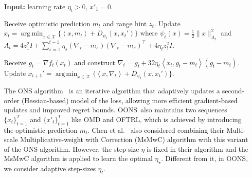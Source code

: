 \documentclass{article}
\renewcommand{\citet}{\citep}
\theoremstyle{plain}
\theoremstyle{definition}
\theoremstyle{remark}
\DeclareMathOperator*{\argmin}{arg\,min}
\newcommand{\cX}{\mathcal{X}}
\newcommand{\oons}{{\sc OONS}}
\newcommand{\inner}[2]{\left\langle #1, #2 \right\rangle}
\begin{document}
\begin{algorithm}[t]
\caption{Optimistic Online Newton Step (OONS)}
\label{alg:ONS}

    \textbf{Input:} learning rate $\eta_t>0$, $x'_1=0$.
    
    \begin{algorithmic}[1]
        \STATE Receive optimistic prediction $m_t$ and range hint $z_t$.
        \STATE Update $x_t = \argmin_{x\in\cX}\{\inner{x}{m_t} + D_{\psi_{t}}(x,x_t')\}$  where $\psi_t(x) = \frac{1}{2}\|x\|_{A_t}^2$ and $A_t = 4 z_1^2 I+ \sum_{s=1}^{t-1} \eta_s(\nabla_s \!-\! m_s)(\nabla_s \!-\! m_s)^\top \!+\! 4\eta_t z_t^2 I.$
        
        \STATE Receive ${g_t=\nabla f_t(x_t)}$ and construct ${\nabla_t = g_t + 32 \eta_t \inner{x_t}{g_t - m_t}(g_t - m_t)}$.
        \STATE Update $x_{t+1}' = \argmin_{x\in\cX}\{\inner{x}{\nabla_t} + D_{\psi_t}(x, x_t')\}$.
    \ENDFOR
\end{algorithmic}
\end{algorithm}


The ONS algorithm~\cite{hazan2007logarithmic} is an iterative algorithm that adaptively updates a second-order (Hessian-based) model of the loss, allowing more efficient gradient-based updates and improved regret bounds. \oons\ also maintains two sequences $\{x_t\}_{t=1}^T$ and $\{x'_t\}_{t=1}^T$ like OMD and OFTRL, which is achieved by introducing the optimistic prediction $m_t$. Chen et al.~\citet{chen2021impossible} also considered combining their Multi-scale Multiplicative-weight with Correction (MsMwC) algorithm with this variant of the ONS algorithm. However, the step-size $\eta$ is fixed in their algorithm and the MsMwC algorithm is applied to learn the optimal $\eta_\star$. Different from it, in \oons, we consider adaptive step-sizes $\eta_t$. 

\end{document}
